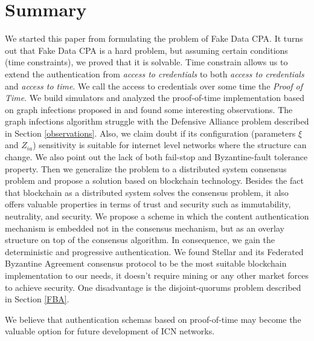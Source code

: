 \chapter{Summary}
We started this paper from formulating the problem of Fake Data CPA. It turns out that Fake Data CPA is a hard problem, but assuming certain conditions (time constraints), we proved that it is solvable. Time constrain allows us to extend the authentication from \textit{access to credentials} to both \textit{access to credentials} and \textit{access to time}. We call the access to credentials over some time the \textit{Proof of Time}. We build simulators and analyzed the proof-of-time implementation based on graph infections proposed in \cite{jekon2019content} and found some interesting observations. The graph infections algorithm struggle with the Defensive Alliance problem described in Section \ref{observations}. Also, we claim doubt if its configuration (parameters $\xi$ and $Z_{ia}$) sensitivity is suitable for internet level networks where the structure can change. We also point out the lack of both fail-stop and Byzantine-fault tolerance property. Then we generalize the problem to a distributed system consensus problem and propose a solution based on blockchain technology. Besides the fact that blockchain as a distributed system solves the consensus problem, it also offers valuable properties in terms of trust and security such as immutability, neutrality, and security. We propose a scheme in which the content authentication mechanism is embedded not in the consensus mechanism, but as an overlay structure on top of the consensus algorithm. In consequence, we gain the deterministic and progressive authentication. We found Stellar and its Federated Byzantine Agreement consensus protocol to be the most suitable blockchain implementation to our needs, it doesn't require mining or any other market forces to achieve security. One disadvantage is the disjoint-quorums problem described in Section \ref{FBA}. 

We believe that authentication schemas based on proof-of-time may become the valuable option for future development of ICN networks. 

